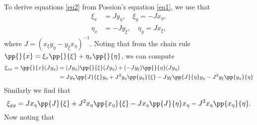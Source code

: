 To derive equations \ref{eq2} from Possion's equation \ref{eq1}, we use that
\begin{align}
    \xi_x &= J y_\eta, \quad \xi_y = - J x_\eta,\\
    \eta_x &= - J y_\xi, \quad \eta_y = J x_\xi,
\end{align}
where $J = (x_\xi y_\eta - y_\xi x_\eta)^{-1}.$ Noting that from the chain rule $\pp{}{x} = \xi_x \pp{}{\xi} + \eta_x \pp{}{\eta}$, we can compute
\begin{align}
    \xi_{xx} = \pp{}{x}(J y_\eta) &= (J y_\eta) \pp{}{\xi}(J y_\eta) + (-J y_\xi) \pp{}{\eta}(J y_\eta) \notag \\
    &= J y_\eta \pp{J}{\xi} y_\eta + J^2 y_\eta \pp{y_\eta}{\xi} - J y_\xi \pp{J}{\eta}y_\eta - J^2 y_\xi \pp{y_\eta}{\eta} \notag \\
\end{align}
Similarly we find that
\begin{equation}
    \xi_{yy} = J x_\eta \pp{J}{\xi} + J^2 x_\eta \pp{x_\eta}{\xi} - J x_\eta \pp{J}{\eta}x_\eta - J^2 x_\eta \pp{x_\eta}{\eta}.
\end{equation}
Now noting that 
